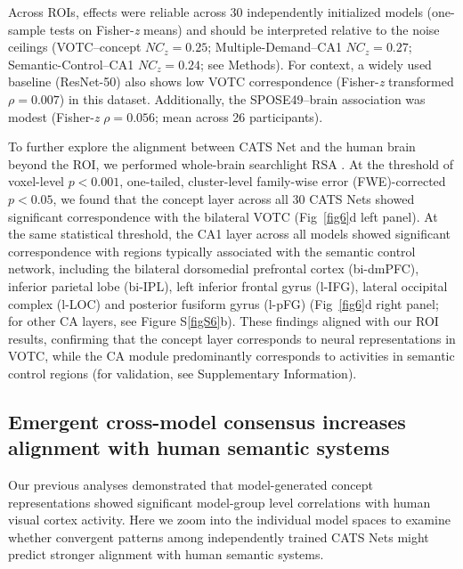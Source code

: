\documentclass[pdflatex,sn-mathphys-num,lineno]{sn-jnl}%
\begin{document}
\begin{CJK}{UTF8}{gbsn}
Across ROIs, effects were reliable across 30 independently initialized models (one-sample tests on Fisher-\textit{z} means) and should be interpreted relative to the noise ceilings (VOTC–concept $NC_z = 0.25$; Multiple-Demand–CA1 $NC_z = 0.27$; Semantic-Control–CA1 $NC_z = 0.24$; see Methods). For context, a widely used baseline (ResNet-50) also shows low VOTC correspondence (Fisher-\textit{z} transformed $\rho = 0.007$) in this dataset. Additionally, the SPOSE49–brain association was modest (Fisher-\textit{z} $\rho = 0.056$; mean across 26 participants).

To further explore the alignment between CATS Net and the human brain beyond the ROI, we performed whole-brain searchlight RSA \cite{kriegeskorte_information-based_2006}. At the threshold of voxel-level $p < 0.001$, one-tailed, cluster-level family-wise error (FWE)-corrected $p < 0.05$, we found that the concept layer across all 30 CATS Nets showed significant correspondence with the bilateral VOTC (Fig~\ref{fig6}d left panel). At the same statistical threshold, the CA1 layer across all models showed significant correspondence with regions typically associated with the semantic control network, including the bilateral dorsomedial prefrontal cortex (bi-dmPFC), inferior parietal lobe (bi-IPL), left inferior frontal gyrus (l-IFG), lateral occipital complex (l-LOC) and posterior fusiform gyrus (l-pFG) (Fig~\ref{fig6}d right panel; for other CA layers, see Figure S\ref{figS6}b). These findings aligned with our ROI results, confirming that the concept layer corresponds to neural representations in VOTC, while the CA module predominantly corresponds to activities in semantic control regions (for validation, see Supplementary Information).

\subsection{Emergent cross-model consensus increases alignment with human semantic systems}
Our previous analyses demonstrated that model-generated concept representations showed significant model-group level correlations with human visual cortex activity. Here we zoom into the individual model spaces to examine whether convergent patterns among independently trained CATS Nets might predict stronger alignment with human semantic systems.


\end{CJK}
\end{document}
